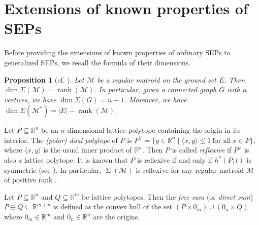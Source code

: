 \documentclass{amsart}
\numberwithin{equation}{section}
\theoremstyle{plain}
\newtheorem{prop}[thm]{Proposition}
\newtheorem{lem}[thm]{Lemma}
\theoremstyle{definition}
\DeclareMathOperator{\init}{in}
\DeclareMathOperator{\rk}{rank}
\newcommand{\RR}{\mathbb{R}}
\newcommand{\calM}{\mathcal{M}}
\DeclareMathOperator{\SEP}{\Sigma}
\begin{document}




\section{Extensions of known properties of SEPs}\label{sec: extensions}

Before providing the extensions of known properties of ordinary SEPs to generalized SEPs, 
we recall the formula of their dimensions. 
\begin{prop}[{cf. \cite[Theorem 4.3]{DJKK}}]\label{prop:dim}
    Let $\calM$ be a regular matroid on the ground set $E$. Then $\dim \Sigma(\calM)=\rk(\calM)$. 
    In particular, given a connected graph $G$ with $n$ vertices, we have $\dim \Sigma(G)=n-1$. 
    Moreover, we have $\dim \Sigma(\calM^*)=|E|-\rk (\calM)$. 
\end{prop}

Let $P \subseteq \RR^n$ be an $n$-dimensional lattice polytope containing the origin in its interior.
The \textit{(polar) dual polytope} of $P$ is
$P^\vee =\{y \in \RR^n  \mid  \langle x, y \rangle \leq 1 \ \text{for all}\  x \in P \},
$
where $\langle x, y \rangle$ is the usual inner product of $\RR^n$.
Then $P$ is called \textit{reflexive} if $P^\vee$
is also a lattice polytope.
It is known that $P$ is reflexive if and only if 
$h^*(P; t)$ is symmetric (see \cite{HibiReflexive, StanleyGorenstein}).
In particular, $\SEP(\calM)$ is reflexive for any regular matroid $\calM$ of positive rank \cite{DJKK}.


Let $P \subseteq \RR^n$ and $Q \subseteq \RR^m$ be lattice polytopes.
Then the \textit{free sum} (or \textit{direct sum}) $P \oplus Q \subseteq \RR^{m+n}$ is defined as
the convex hull of the set $(P \times 0_m) \cup (0_n \times Q)$ where $0_m \in \RR^m$ and $0_n \in \RR^n$
are the origins.
\end{document}
